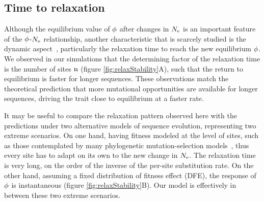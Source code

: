 \subsection{Time to relaxation}

Although the equilibrium value of $\phi$ after changes in $N_{\mathrm{e}}$ is an important feature of the $\phi$-$N_{\mathrm{e}}$ relationship, another characteristic that is scarcely studied is the dynamic aspect~\citep{Jones2016}, particularly the relaxation time to reach the new equilibrium $\phi$.
We observed in our simulations that the determining factor of the relaxation time is the number of sites $\text{n}$ (figure \ref{fig:relaxStability}A), such that the return to equilibrium is faster for longer sequences.
These observations match the theoretical prediction that more mutational opportunities are available for longer sequences, driving the trait close to equilibrium at a faster rate.

It may be useful to compare the relaxation pattern observed here with the predictions under two alternative models of sequence evolution, representing two extreme scenarios.
On one hand, having fitness modeled at the level of sites, such as those contemplated by many phylogenetic mutation-selection models~\citep{Halpern1998, Rodrigue2010, Tamuri2012}, thus every site has to adapt on its own to the new change in $N_{\mathrm{e}}$.
The relaxation time is very long, on the order of the inverse of the per-site \gls{substitution} rate.
On the other hand, assuming a fixed distribution of fitness effect (\acrshort{DFE}), the response of $\phi$ is instantaneous (figure \ref{fig:relaxStability}B).
Our model is effectively in between these two extreme scenarios.


